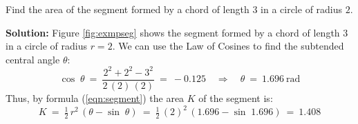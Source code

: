 \begin{exmp}
\piccaption[]{\label{fig:exmpseg}}
\noindent Find the area of the segment formed by a chord of length $3$ in a circle of radius $2$.\vspace{1mm}
 \par\noindent\textbf{Solution:} Figure \ref{fig:exmpseg} shows the segment formed by a chord
 of length $3$ in a circle of radius $r=2$. We can use the Law of Cosines to find
 the subtended central angle $\theta$:
 \begin{displaymath}
  \cos\;\theta ~=~ \frac{2^2 + 2^2 - 3^2}{2\,(2)\,(2)} ~=~ -0.125 \quad\Rightarrow\quad
   \theta ~=~ 1.696~\text{rad}
 \end{displaymath}
 Thus, by formula (\ref{eqn:segment}) the area $K$ of the segment is:
 \begin{displaymath}
  K ~=~ \tfrac{1}{2}\,r^2 \,(\theta - \sin\;\theta) ~=~ \tfrac{1}{2}\,(2)^2 \,
  (1.696 - \sin\;1.696) ~=~ \boxed{1.408}
 \end{displaymath}
\end{exmp}
\divider
\newpage

